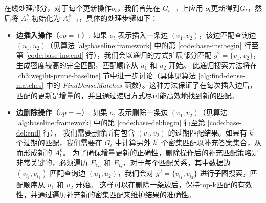 在线处理部分，对于每个更新操作$o_t$，我们首先在 $G_{t-1}$ 上应用 $o_t$更新得到$G_t$，然后将 $A_t^k$ 初始化为 $A_{t-1}^k$，具体的处理步骤如下：
\begin{itemize}
    \item \textbf{边插入操作}（$op=+$）: 如果 $o_t$ 表示插入一条边 $(v_1, v_2)$，该边匹配查询边 $(u_1, u_2)$（见算法 \ref{alg:baseline:framework} 中的第 \ref{code:base-ins:begin} 行至第 \ref{code:base-ins:end} 行），我们会以递归的方式扩展部分匹配 $g^2 = \{v_1, v_2\}$，生成密度较高的完全匹配，匹配顺序从 $u_1$ 和 $u_2$ 开始。
    此递归搜索方法将在 \ref{ch3:wegiht-prune-baseline} 节中进一步讨论（具体见算法 \ref{alg:find-dense-matches} 中的 \emph{FindDenseMatches} 函数）。这种方法保证了在每次插入边后，匹配的更新是增量的，并且通过递归方式尽可能高效地找到新的匹配。
    \item \textbf{边删除操作}（$op=-$）:  如果 $o_t$ 表示删除一条边 $(v_1, v_2)$（见算法 \ref{alg:baseline:framework} 中的第 \ref{code:base-del:begin} 行至第 \ref{code:base-del:end} 行），
    我们需要删除所有包含 $(v_1, v_2)$ 的过期匹配结果。如果有 $k^\prime$ 个过期的匹配，我们需要在 $G_t$ 中计算另外 $k^\prime$ 个密集匹配以补充答案集合，从而形成新的 $A_{t}^k$。
    为了确保增量更新的正确性，删除操作后的补充匹配策略是非常关键的，必须遍历 $E_{G_t}$ 和 $E_Q$，对于每个匹配关系，其中数据边 $(v_{i_1}, v_{i_2})$ 匹配查询边 $(u_1, u_2)$，我们会对 $g^2 = \{v_{i_1}, v_{i_2}\}$ 进行子图搜索，匹配顺序从 $u_1$ 和 $u_2$ 开始。
    这样可以在删除一条边后，保持top-k匹配的有效性，并通过遍历补充新的密集匹配来维护结果的准确性。
\end{itemize}
